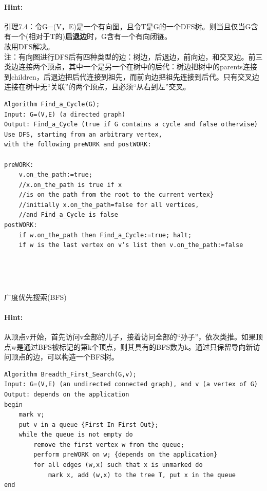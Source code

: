 \documentclass{article}
\begin{document}
     \paragraph{Hint:}引理7.4：令G=(V，E)是一个有向图，且令T是G的一个DFS树。则当且仅当G含有一个(相对于T的)\textbf{后退边}时，G含有一个有向闭链。\\
     故用DFS解决。\\
     注：有向图进行DFS后有四种类型的边：树边，后退边，前向边，和交叉边。前三类边连接两个顶点，其中一个是另一个在树中的后代：树边把树中的parents连接到children，后退边把后代连接到祖先，而前向边把祖先连接到后代。只有交叉边连接在树中无“关联”的两个顶点，且必须“从右到左”交叉。
     
     \lstset{language=C}
    \begin{lstlisting}
Algorithm Find_a_Cycle(G);
Input: G=(V,E) (a directed graph)
Output: Find_a_Cycle (true if G contains a cycle and false otherwise)
Use DFS, starting from an arbitrary vertex, 
with the following preWORK and postWORK:

preWORK:
    v.on_the_path:=true;
    //x.on_the_path is true if x 
    //is on the path from the root to the current vertex}
    //initially x.on_the_path=false for all vertices, 
    //and Find_a_Cycle is false
postWORK:
    if w.on_the_path then Find_a_Cycle:=true; halt;
    if w is the last vertex on v’s list then v.on_the_path:=false

    
    
      \end{lstlisting}

     \subsubsection{}广度优先搜索(BFS)
     \paragraph{Hint:}从顶点v开始，首先访问v全部的儿子，接着访问全部的“孙子”，依次类推。如果顶点w是通过BFS被标记的第k个顶点，则其具有的BFS数为k。通过只保留导向新访问顶点的边，可以构造一个BFS树。\\
          \lstset{language=C}
    \begin{lstlisting}
Algorithm Breadth_First_Search(G,v);
Input: G=(V,E) (an undirected connected graph), and v (a vertex of G)
Output: depends on the application
begin
    mark v;
    put v in a queue {First In First Out};
    while the queue is not empty do
        remove the first vertex w from the queue;
        perform preWORK on w; {depends on the application}
        for all edges (w,x) such that x is unmarked do
            mark x, add (w,x) to the tree T, put x in the queue
end

      \end{lstlisting}
      
\end{document}
